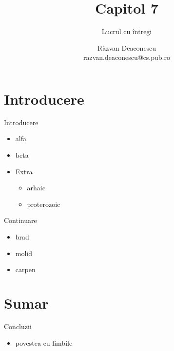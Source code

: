 \documentclass{training}
\title[Capitol 7]{Capitol 7}
\subtitle{Lucrul cu întregi}
\author[Răzvan]{Răzvan Deaconescu\\razvan.deaconescu@cs.pub.ro}
\date{}
\begin{document}
\frame{\titlepage}

\frame{\tableofcontents}

\section{Introducere}

\begin{frame}{Introducere}
  \begin{itemize}
    \item alfa
    \item beta
    \item Extra
      \begin{itemize}
        \item arhaic
        \item proterozoic
      \end{itemize}
  \end{itemize}
\end{frame}

\begin{frame}{Continuare}
  \begin{itemize}
    \item brad
    \item molid
    \item carpen
  \end{itemize}
\end{frame}

\frame{\tableofcontents}

\section{Sumar}

\begin{frame}{Concluzii}
  \begin{itemize}
    \item povestea cu limbile
  \end{itemize}
\end{frame}
\end{document}

